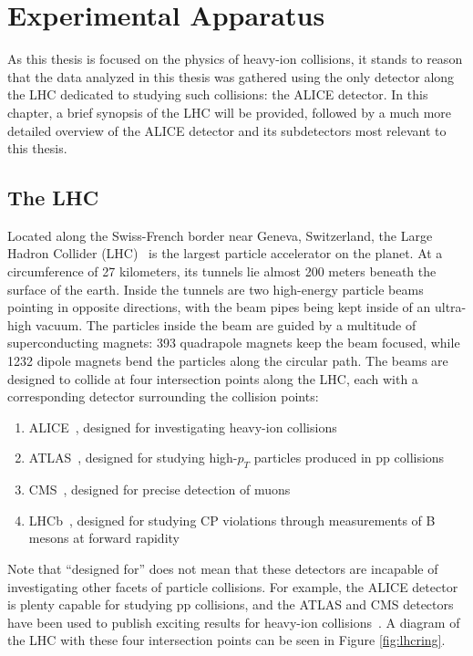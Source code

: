 \chapter{Experimental Apparatus}
As this thesis is focused on the physics of heavy-ion collisions, it stands to reason that the data analyzed in this thesis was gathered using the only detector along the LHC dedicated to studying such collisions: the ALICE detector. In this chapter, a brief synopsis of the LHC will be provided, followed by a much more detailed overview of the ALICE detector and its subdetectors most relevant to this thesis.

\section{The LHC}
Located along the Swiss-French border near Geneva, Switzerland, the Large Hadron Collider (LHC)~\cite{LHC1, LHC2} is the largest particle accelerator on the planet. At a circumference of 27 kilometers, its tunnels lie almost 200 meters beneath the surface of the earth. Inside the tunnels are two high-energy particle beams pointing in opposite directions, with the beam pipes being kept inside of an ultra-high vacuum.
The particles inside the beam are guided by a multitude of superconducting magnets: 393 quadrapole magnets keep the beam focused, while 1232 dipole magnets bend the particles along the circular path. 
The beams are designed to collide at four intersection points along the LHC, each with a corresponding detector surrounding the collision points: 
\begin{enumerate}
\item ALICE~\cite{ALICE}, designed for investigating heavy-ion collisions
\item ATLAS~\cite{ATLAS}, designed for studying high-$p_{T}$ particles produced in pp collisions 
\item CMS~\cite{CMS},   designed for precise detection of muons
\item LHCb~\cite{LHCb}, designed for studying CP violations through measurements of B mesons at forward rapidity
\end{enumerate}
Note that ``designed for'' does not mean that these detectors are incapable of investigating other facets of particle collisions. For example, the ALICE detector is plenty capable for studying pp collisions\cite{ALICEpp1, ALICEpp2}, and the ATLAS and CMS detectors have been used to publish exciting results for heavy-ion collisions~\cite{CMSHeavy1, ATLASHeavy1}. A diagram of the LHC with these four intersection points can be seen in Figure \ref{fig:lhcring}.
